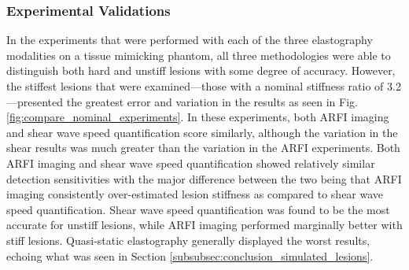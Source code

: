 		\FloatBarrier
		\subsubsection{Experimental Validations}
			In the experiments that were performed with each of the three elastography modalities on a tissue mimicking phantom, all three methodologies were able to distinguish both hard and unstiff lesions with some degree of accuracy. However, the stiffest lesions that were examined---those with a nominal stiffness ratio of 3.2---presented the greatest error and variation in the results as seen in Fig. \ref{fig:compare_nominal_experiments}. In these experiments, both ARFI imaging and shear wave speed quantification score similarly, although the variation in the shear results was much greater than the variation in the ARFI experiments. Both ARFI imaging and shear wave speed quantification showed relatively similar detection sensitivities with the major difference between the two being that ARFI imaging consistently over-estimated lesion stiffness as compared to shear wave speed quantification. Shear wave speed quantification was found to be the most accurate for unstiff lesions, while ARFI imaging performed marginally better with stiff lesions. Quasi-static elastography generally displayed the worst results, echoing what was seen in Section \ref{subsubsec:conclusion_simulated_lesions}.

